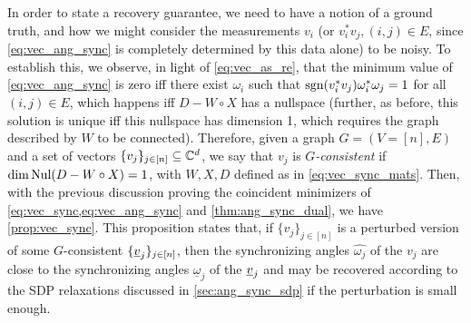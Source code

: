 In order to state a recovery guarantee, we need to have a notion of a ground truth, and how we might consider the measurements $v_i$ (or $v_i^* v_j, (i, j) \in E$, since \eqref{eq:vec_ang_sync} is completely determined by this data alone) to be noisy.  To establish this, we observe, in light of \eqref{eq:vec_as_re}, that the minimum value of \eqref{eq:vec_ang_sync} is zero iff there exist $\omega_i$ such that $\operatorname{sgn}(v_i^* v_j) \omega_i^* \omega_j = 1$ for all $(i, j) \in E$, which happens iff $D - W \circ X$ has a nullspace (further, as before, this solution is unique iff this nullspace has dimension 1, which requires the graph described by $W$ to be connected).  Therefore, given a graph $G = (V = [n], E)$ and a set of vectors $\{v_j\}_{j \in [n]} \subseteq \mathbb{C}^d$, we say that $v_j$ is \emph{$G$-consistent} if $\dim\operatorname{Nul}(D - W \circ X) = 1$, with $W, X, D$ defined as in \eqref{eq:vec_sync_mats}.  Then, with the previous discussion proving the coincident minimizers of \cref{eq:vec_sync,eq:vec_ang_sync} and \cref{thm:ang_sync_dual}, we have \cref{prop:vec_sync}.  This proposition states that, if $\{v_j\}_{j \in [n]}$ is a perturbed version of some $G$-consistent $\{\underline{v}_j\}_{j \in [n]}$, then the synchronizing angles $\hat{\omega_j}$ of the $v_j$ are close to the synchronizing angles $\underline{\omega}_j$ of the $\underline{v}_j$ and may be recovered according to the SDP relaxations discussed in \cref{sec:ang_sync_sdp} if the perturbation is small enough.

